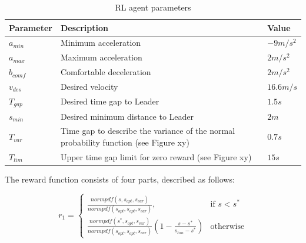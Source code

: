 \documentclass[review]{elsarticle}
\begin{document}
\begin{table}
\caption{RL agent parameters} 
\label{tab:agentParameters} 
\begin{center}
\begin{tabular}{ p{} p{} p{}}
	Parameter & Description & Value \\ \hline
	$a_{min}$ & Minimum acceleration & $-9m/s^2$ \\  
	$a_{max}$ & Maximum acceleration & $2m/s^2$ \\  
	$b_{comf}$ & Comfortable deceleration & $2m/s^2$ \\  
	$v_{des}$ & Desired velocity & $16.6 m/s$ \\  		
	$T_{gap}$ & Desired time gap to Leader & $1.5s$ \\
	$s_{min}$ & Desired minimum distance to Leader & $2m$ \\
	$T_{var}$ & Time gap to describe the variance of the normal probability function (see Figure xy) & $0.7s$ \\
	$T_{lim}$ & Upper time gap limit for zero reward (see Figure xy) & $15s$ 
\end{tabular}
\end{center}
\end{table}


The reward function consists of four parts, described as follows:


\begin{equation}
r_1  = 
\begin{cases}
\frac{normpdf(s,  s_{opt},  s_{var})}{normpdf( s_{opt},  s_{opt},  s_{var})},& \text{if } s < s^*\\
\frac{normpdf(s^*,  s_{opt},  s_{var})}{normpdf( s_{opt},  s_{opt},  s_{var})} (1-\frac{s-s^*}{s_{lim} - s^*})              & \text{otherwise}
\end{cases}
\end{equation}
\end{document}
